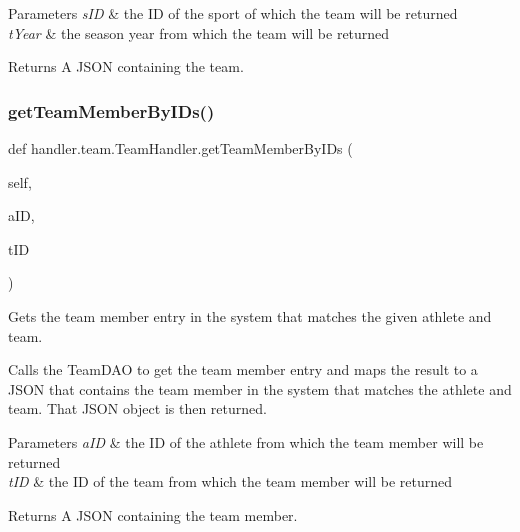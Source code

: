 \begin{DoxyParams}{Parameters}
{\em s\+ID} & the ID of the sport of which the team will be returned \\
\hline
{\em t\+Year} & the season year from which the team will be returned\\
\hline
\end{DoxyParams}
\begin{DoxyReturn}{Returns}
A J\+S\+ON containing the team. 
\end{DoxyReturn}
\mbox{\label{classhandler_1_1team_1_1_team_handler_a1a00f6d69828c15ce2da7b4215c868cf}} 
\subsubsection{\texorpdfstring{get\+Team\+Member\+By\+I\+Ds()}{getTeamMemberByIDs()}}
{\footnotesize\ttfamily def handler.\+team.\+Team\+Handler.\+get\+Team\+Member\+By\+I\+Ds (\begin{DoxyParamCaption}\item[{}]{self,  }\item[{}]{a\+ID,  }\item[{}]{t\+ID }\end{DoxyParamCaption})}



Gets the team member entry in the system that matches the given athlete and team. 

Calls the Team\+D\+AO to get the team member entry and maps the result to a J\+S\+ON that contains the team member in the system that matches the athlete and team. That J\+S\+ON object is then returned.


\begin{DoxyParams}{Parameters}
{\em a\+ID} & the ID of the athlete from which the team member will be returned \\
\hline
{\em t\+ID} & the ID of the team from which the team member will be returned\\
\hline
\end{DoxyParams}
\begin{DoxyReturn}{Returns}
A J\+S\+ON containing the team member. 
\end{DoxyReturn}
\mbox{\label{classhandler_1_1team_1_1_team_handler_a01c7ec029ad084fb936ef9c90ef3a1c0}} 
